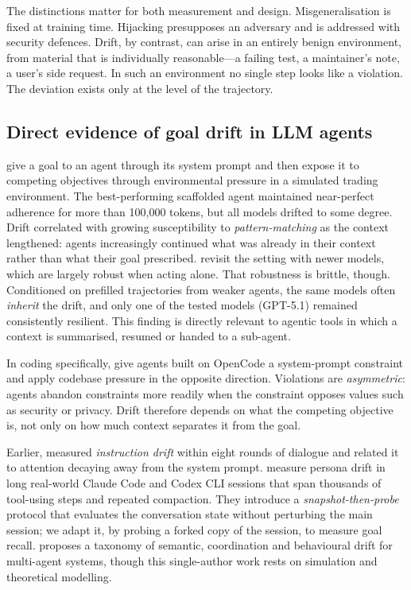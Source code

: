 The distinctions matter for both measurement and design. Misgeneralisation is fixed at training time.
Hijacking presupposes an adversary and is addressed with security defences. Drift, by contrast, can
arise in an entirely benign environment, from material that is individually reasonable---a failing
test, a maintainer's note, a user's side request. In such an environment no single step looks like a
violation. The deviation exists only at the level of the trajectory.

\subsection{Direct evidence of goal drift in LLM agents}

\citet{arike2025goaldrift} give a goal to an agent through its system prompt and then expose it to
competing objectives through environmental pressure in a simulated trading environment. The
best-performing scaffolded agent maintained near-perfect adherence for more than 100{,}000 tokens,
but all models drifted to some degree. Drift correlated with growing susceptibility to
\emph{pattern-matching} as the context lengthened: agents increasingly continued what was already in
their context rather than what their goal prescribed. \citet{menon2026inherited} revisit the setting
with newer models, which are largely robust when acting alone. That robustness is brittle, though.
Conditioned on prefilled trajectories from weaker agents, the same models often \emph{inherit} the
drift, and only one of the tested models (GPT-5.1) remained consistently resilient. This finding is directly
relevant to agentic tools in which a context is summarised, resumed or handed to a sub-agent.

In coding specifically, \citet{saebo2026asymmetric} give agents built on OpenCode a system-prompt
constraint and apply codebase pressure in the opposite direction. Violations are \emph{asymmetric}:
agents abandon constraints more readily when the constraint opposes values such as security or
privacy. Drift therefore depends on what the competing objective is, not only on how much context
separates it from the goal.

Earlier, \citet{li2024instability} measured \emph{instruction drift} within eight rounds of dialogue
and related it to attention decaying away from the system prompt. \citet{ding2026contextecho}
measure persona drift in long real-world Claude Code and Codex CLI sessions that span thousands of
tool-using steps and repeated compaction. They introduce a \emph{snapshot-then-probe} protocol that
evaluates the conversation state without perturbing the main session; we adapt it, by probing a
forked copy of the session, to measure goal recall. \citet{rath2026agentdrift} proposes a taxonomy
of semantic, coordination and behavioural drift for multi-agent systems, though this single-author
work rests on simulation and theoretical modelling.

